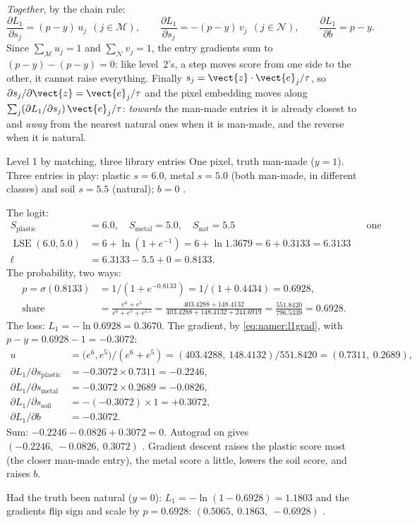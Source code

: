 \emph{Together}, by the chain rule:
\begin{equation}
\frac{\partial L_1}{\partial s_j}=(p-y)\,u_j\ \ (j\in\mathcal{M}),\qquad
\frac{\partial L_1}{\partial s_j}=-(p-y)\,v_j\ \ (j\in\mathcal{N}),\qquad
\frac{\partial L_1}{\partial b}=p-y .
\label{eq:namer:l1grad}
\end{equation}
Since $\sum_{\mathcal{M}}u_j=1$ and $\sum_{\mathcal{N}}v_j=1$, the entry gradients sum to $(p-y)-(p-y)=0$: like level~2's,
a step moves score from one side to the other, it cannot raise everything. Finally
$s_j=\vect{z}\cdot\vect{e}_j/\tau$, so $\partial s_j/\partial\vect{z}=\vect{e}_j/\tau$ and the pixel embedding moves
along $\sum_j(\partial L_1/\partial s_j)\,\vect{e}_j/\tau$: \emph{towards} the man-made entries it is already closest to
and \emph{away} from the nearest natural ones when it is man-made, and the reverse when it is natural.

\begin{worked}[label={we:namer:l1}]{Level 1 by matching, three library entries}
One pixel, truth man-made ($y=1$). Three entries in play: plastic $s=6.0$, metal $s=5.0$ (both man-made, in different
classes) and soil $s=5.5$ (natural); $b=0$ \tagA.

The logit:
\begin{align*}
S_{\text{plastic}} &= 6.0,\quad S_{\text{metal}}=5.0,\quad S_{\text{nat}}=5.5 &&\text{one member each}\\
\operatorname{LSE}(6.0,5.0) &= 6+\ln(1+e^{-1}) = 6+\ln1.3679 = 6+0.3133 = 6.3133\\
\ell &= 6.3133-5.5+0 = 0.8133 .
\end{align*}
The probability, two ways:
\begin{align*}
p=\sigma(0.8133) &= 1/(1+e^{-0.8133}) = 1/(1+0.4434) = 0.6928,\\
\text{share} &= \frac{e^{6}+e^{5}}{e^{6}+e^{5}+e^{5.5}} = \frac{403.4288+148.4132}{403.4288+148.4132+244.6919}
= \frac{551.8420}{796.5339} = 0.6928 .
\end{align*}
The loss: $L_1=-\ln0.6928=0.3670$. The gradient, by \cref{eq:namer:l1grad}, with $p-y=0.6928-1=-0.3072$:
\begin{align*}
u &= \big(e^{6},e^{5}\big)/(e^{6}+e^{5}) = (403.4288,\ 148.4132)/551.8420 = (0.7311,\ 0.2689),\\
\partial L_1/\partial s_{\text{plastic}} &= -0.3072\times0.7311 = -0.2246,\\
\partial L_1/\partial s_{\text{metal}} &= -0.3072\times0.2689 = -0.0826,\\
\partial L_1/\partial s_{\text{soil}} &= -(-0.3072)\times1 = +0.3072,\\
\partial L_1/\partial b &= -0.3072 .
\end{align*}
Sum: $-0.2246-0.0826+0.3072=0$. Autograd on  gives $(-0.2246,\ -0.0826,\ 0.3072)$ \tagC. Gradient
descent raises the plastic score most (the closer man-made entry), the metal score a little, lowers the soil score, and
raises $b$.

Had the truth been natural ($y=0$): $L_1=-\ln(1-0.6928)=1.1803$ and the gradients flip sign and scale by $p=0.6928$:
$(0.5065,\ 0.1863,\ -0.6928)$ \tagC.
\end{worked}

